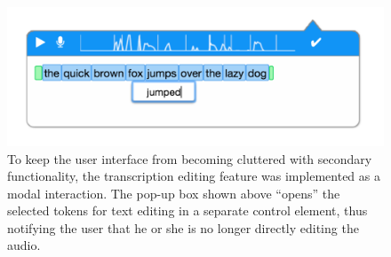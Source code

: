 \begin{figure}
	\centering
	\includegraphics[width=\columnwidth,keepaspectratio]{figures/transcription_edit}
	\caption{To keep the user interface from becoming cluttered with secondary functionality, the transcription editing feature was implemented as a modal interaction. The pop-up box shown above ``opens'' the selected tokens for text editing in a separate control element, thus notifying the user that he or she is no longer directly editing the audio.}
	\label{fig:transcription}
\end{figure}